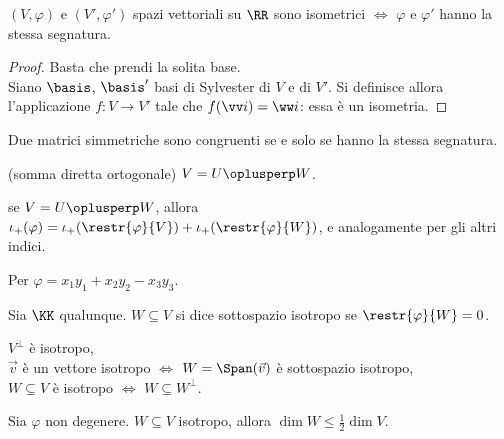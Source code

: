 \documentclass[11pt]{article}
\begin{document}
	\begin{proposition} $(V, \varphi)$ e $(V', \varphi')$ spazi vettoriali
		su $\RR$ sono
		isometrici $\iff$ $\varphi$ e $\varphi'$ hanno la stessa segnatura.
	\end{proposition}

	\begin{proof}
		\rightproof Basta che prendi la solita base. \\
		\leftproof Siano $\basis$, $\basis'$ basi di Sylvester di $V$
		e di $V'$. Si definisce allora l'applicazione $f : V \to V'$ tale
		che $f(\vv i) = \ww i$: essa è un isometria.
	\end{proof}

	\begin{corollary}
		Due matrici simmetriche sono congruenti se e solo se hanno
		la stessa segnatura.
	\end{corollary}

	\begin{definition} (somma diretta ortogonale)
		$V = U \oplusperp W$.
	\end{definition}

	\begin{remark}\nl
		\li se $V = U \oplusperp W$, allora $\iota_+(\varphi) = \iota_+(\restr{\varphi}{V}) + \iota_+(\restr{\varphi}{W})$, e
		analogamente per gli altri indici.
	\end{remark}

	\begin{example}
		Per $\varphi = x_1 y_1 + x_2 y_2 - x_3 y_3$. %
	\end{example}

	\begin{definition}
		Sia $\KK$ qualunque. $W \subseteq V$ si dice sottospazio isotropo
		se $\restr{\varphi}{W} = 0$.
	\end{definition}

	\begin{remark}\nl
		\li $V^\perp$ è isotropo, \\
		\li $\vec{v}$ è un vettore isotropo $\iff$ $W = \Span(\vec v)$ è sottospazio isotropo, \\
		\li $W \subseteq V$ è isotropo $\iff$ $W \subseteq W^\perp$.
	\end{remark}

	\begin{proposition}
		Sia $\varphi$ non degenere. $W \subseteq V$ isotropo, allora
		$\dim W \leq \frac{1}{2} \dim V$.
	\end{proposition}
\end{document}
